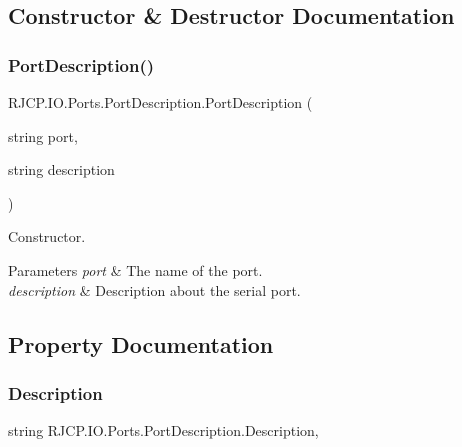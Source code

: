 \subsection{Constructor \& Destructor Documentation}
\mbox{\label{class_r_j_c_p_1_1_i_o_1_1_ports_1_1_port_description_a9a717ec62b5fab9355f6db5ed545ca01}} 
\subsubsection{\texorpdfstring{PortDescription()}{PortDescription()}}
{\footnotesize\ttfamily R\+J\+C\+P.\+I\+O.\+Ports.\+Port\+Description.\+Port\+Description (\begin{DoxyParamCaption}\item[{string}]{port,  }\item[{string}]{description }\end{DoxyParamCaption})}



Constructor. 


\begin{DoxyParams}{Parameters}
{\em port} & The name of the port.\\
\hline
{\em description} & Description about the serial port.\\
\hline
\end{DoxyParams}


\subsection{Property Documentation}
\mbox{\label{class_r_j_c_p_1_1_i_o_1_1_ports_1_1_port_description_a1c92d3e14698be56649457e2fbe64bd8}} 
\subsubsection{\texorpdfstring{Description}{Description}}
{\footnotesize\ttfamily string R\+J\+C\+P.\+I\+O.\+Ports.\+Port\+Description.\+Description\hspace{0.3cm}{\ttfamily [get]}, {\ttfamily [set]}}




